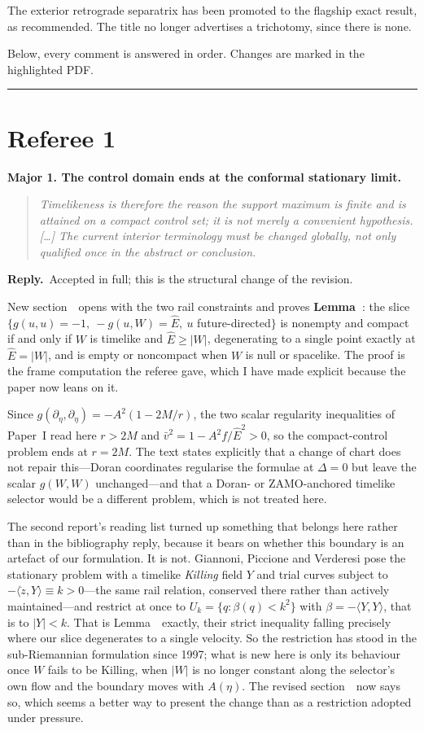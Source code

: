 \documentclass[11pt]{article}
\newenvironment{referee}
  {\begin{quote}\itshape\small}
  {\end{quote}}
\newcommand{\reply}{\par\noindent\textbf{Reply.}\ }
\newcommand{\R}[1]{\par\medskip\noindent\textbf{#1}\par\nopagebreak}
\begin{document}
The exterior retrograde separatrix has been promoted to the flagship exact
result, as recommended. The title no longer advertises a trichotomy, since there
is none.

Below, every comment is answered in order. Changes are marked in the highlighted
PDF.

\bigskip
\hrule
\section*{Referee 1}

\R{Major 1. The control domain ends at the conformal stationary limit.}

\begin{referee}
Timelikeness is therefore the reason the support maximum is finite and is
attained on a compact control set; it is not merely a convenient hypothesis.
[\dots] The current interior terminology must be changed globally, not only
qualified once in the abstract or conclusion.
\end{referee}

\reply Accepted in full; this is the structural change of the revision.

New section~\msSecDomain\ opens with the two rail constraints and proves
\textbf{Lemma~\msLemCompact}: the slice $\{g(u,u)=-1,\ -g(u,W)=\hat E,\ u$ future-directed$\}$
is nonempty and compact if and only if $W$ is timelike and $\hat E\ge|W|$,
degenerating to a single point exactly at $\hat E=|W|$, and is empty or
noncompact when $W$ is null or spacelike. The proof is the frame computation the
referee gave, which I have made explicit because the paper now leans on it.

Since $g(\partial_\eta,\partial_\eta)=-A^2(1-2M/r)$, the two scalar regularity
inequalities of Paper~I read here $r>2M$ and $\bar v^2=1-A^2f/\hat E^2>0$, so the
compact-control problem ends at $r=2M$. The text states explicitly that a change
of chart does not repair this---Doran coordinates regularise the formulae at
$\Delta=0$ but leave the scalar $g(W,W)$ unchanged---and that a Doran- or
ZAMO-anchored timelike selector would be a different problem, which is not
treated here.

The second report's reading list turned up something that belongs here rather than
in the bibliography reply, because it bears on whether this boundary is an artefact
of our formulation. It is not. Giannoni,
Piccione and Verderesi pose the stationary problem with a timelike \emph{Killing}
field $Y$ and trial curves subject to $-\langle\dot z,Y\rangle\equiv k>0$---the same
rail relation, conserved there rather than actively maintained---and restrict at
once to $U_k=\{q:\beta(q)<k^2\}$ with $\beta=-\langle Y,Y\rangle$, that is to
$|Y|<k$. That is Lemma~\msLemCompact\ exactly, their strict inequality falling
precisely where our slice degenerates to a single velocity. So the restriction has
stood in the sub-Riemannian formulation since 1997; what is new here is only its
behaviour once $W$ fails to be Killing, when $|W|$ is no longer constant along the
selector's own flow and the boundary moves with $A(\eta)$. The revised
section~\msSecDomain\ now says so, which seems a better way to present the change
than as a restriction adopted under pressure.
\end{document}
